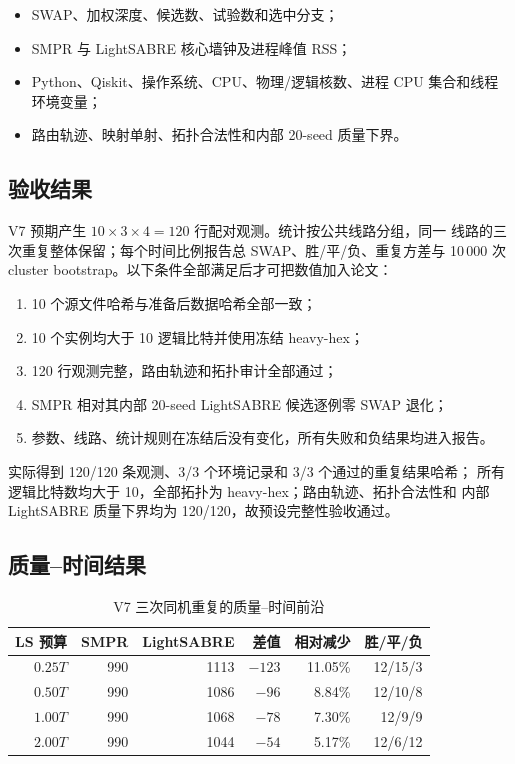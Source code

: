 \documentclass[11pt,a4paper]{article}
\begin{document}
\begin{itemize}
  \item SWAP、加权深度、候选数、试验数和选中分支；
  \item SMPR 与 LightSABRE 核心墙钟及进程峰值 RSS；
  \item Python、Qiskit、操作系统、CPU、物理/逻辑核数、进程 CPU 集合和线程环境变量；
  \item 路由轨迹、映射单射、拓扑合法性和内部 20-seed 质量下界。
\end{itemize}

\subsection{验收结果}

V7 预期产生 $10\times3\times4=120$ 行配对观测。统计按公共线路分组，同一
线路的三次重复整体保留；每个时间比例报告总 SWAP、胜/平/负、重复方差与
10\,000 次 cluster bootstrap。以下条件全部满足后才可把数值加入论文：

\begin{enumerate}
  \item 10 个源文件哈希与准备后数据哈希全部一致；
  \item 10 个实例均大于 10 逻辑比特并使用冻结 heavy-hex；
  \item 120 行观测完整，路由轨迹和拓扑审计全部通过；
  \item SMPR 相对其内部 20-seed LightSABRE 候选逐例零 SWAP 退化；
  \item 参数、线路、统计规则在冻结后没有变化，所有失败和负结果均进入报告。
\end{enumerate}

实际得到 120/120 条观测、3/3 个环境记录和 3/3 个通过的重复结果哈希；
所有逻辑比特数均大于 10，全部拓扑为 heavy-hex；路由轨迹、拓扑合法性和
内部 LightSABRE 质量下界均为 120/120，故预设完整性验收通过。

\subsection{质量--时间结果}

\begin{table}[H]
\centering
\small
\caption{V7 三次同机重复的质量--时间前沿}
\begin{tabular}{rrrrrr}
\toprule
LS 预算 & SMPR & LightSABRE & 差值 & 相对减少 & 胜/平/负 \\
\midrule
$0.25T$ & 990 & 1113 & $-123$ & 11.05\% & 12/15/3 \\
$0.50T$ & 990 & 1086 &  $-96$ &  8.84\% & 12/10/8 \\
$1.00T$ & 990 & 1068 &  $-78$ &  7.30\% & 12/9/9 \\
$2.00T$ & 990 & 1044 &  $-54$ &  5.17\% & 12/6/12 \\
\bottomrule
\end{tabular}
\end{table}
\end{document}
